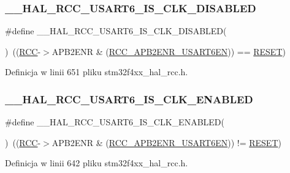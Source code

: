 \subsubsection{\texorpdfstring{\+\_\+\+\_\+\+H\+A\+L\+\_\+\+R\+C\+C\+\_\+\+U\+S\+A\+R\+T6\+\_\+\+I\+S\+\_\+\+C\+L\+K\+\_\+\+D\+I\+S\+A\+B\+L\+ED}{\_\_HAL\_RCC\_USART6\_IS\_CLK\_DISABLED}}
{\footnotesize\ttfamily \#define \+\_\+\+\_\+\+H\+A\+L\+\_\+\+R\+C\+C\+\_\+\+U\+S\+A\+R\+T6\+\_\+\+I\+S\+\_\+\+C\+L\+K\+\_\+\+D\+I\+S\+A\+B\+L\+ED(\begin{DoxyParamCaption}{ }\end{DoxyParamCaption})~((\hyperlink{group___peripheral__declaration_ga74944438a086975793d26ae48d5882d4}{R\+CC}-\/$>$A\+P\+B2\+E\+NR \& (\hyperlink{group___peripheral___registers___bits___definition_ga0569d91f3b18ae130b7a09e0100c4459}{R\+C\+C\+\_\+\+A\+P\+B2\+E\+N\+R\+\_\+\+U\+S\+A\+R\+T6\+EN})) == \hyperlink{group___exported__types_gga89136caac2e14c55151f527ac02daaffa589b7d94a3d91d145720e2fed0eb3a05}{R\+E\+S\+ET})}



Definicja w linii 651 pliku stm32f4xx\+\_\+hal\+\_\+rcc.\+h.

\mbox{\label{group___r_c_c___a_p_b2___peripheral___clock___enable___disable___status_ga639ccb1e63662b309fc875bc608aa7e6}} 
\subsubsection{\texorpdfstring{\+\_\+\+\_\+\+H\+A\+L\+\_\+\+R\+C\+C\+\_\+\+U\+S\+A\+R\+T6\+\_\+\+I\+S\+\_\+\+C\+L\+K\+\_\+\+E\+N\+A\+B\+L\+ED}{\_\_HAL\_RCC\_USART6\_IS\_CLK\_ENABLED}}
{\footnotesize\ttfamily \#define \+\_\+\+\_\+\+H\+A\+L\+\_\+\+R\+C\+C\+\_\+\+U\+S\+A\+R\+T6\+\_\+\+I\+S\+\_\+\+C\+L\+K\+\_\+\+E\+N\+A\+B\+L\+ED(\begin{DoxyParamCaption}{ }\end{DoxyParamCaption})~((\hyperlink{group___peripheral__declaration_ga74944438a086975793d26ae48d5882d4}{R\+CC}-\/$>$A\+P\+B2\+E\+NR \& (\hyperlink{group___peripheral___registers___bits___definition_ga0569d91f3b18ae130b7a09e0100c4459}{R\+C\+C\+\_\+\+A\+P\+B2\+E\+N\+R\+\_\+\+U\+S\+A\+R\+T6\+EN})) != \hyperlink{group___exported__types_gga89136caac2e14c55151f527ac02daaffa589b7d94a3d91d145720e2fed0eb3a05}{R\+E\+S\+ET})}



Definicja w linii 642 pliku stm32f4xx\+\_\+hal\+\_\+rcc.\+h.

